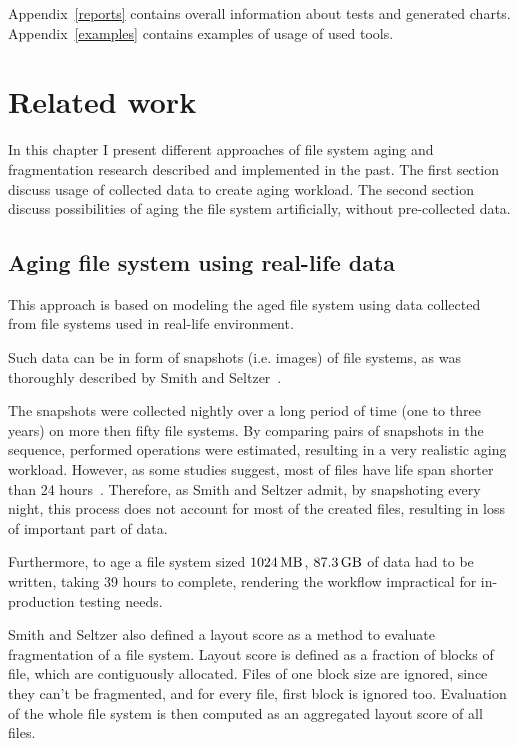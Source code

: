 \documentclass[
  color, %
  table, %
  lof,   %
  lot,   %
]{fithesis3}
\begin{document}
Appendix~\ref{reports} contains overall information about tests and generated charts. Appendix~\ref{examples} contains examples of usage of used tools.  

\chapter{Related work}
\label{2}
In this chapter I present different approaches of file system aging and fragmentation research described and implemented in the past. The first section discuss usage of collected data to create aging workload. The second section discuss possibilities of aging the file system artificially, without pre-collected data.

\section{Aging file system using real-life data}
This approach is based on modeling the aged file system using data collected from file systems used in real-life environment.

Such data can be in form of snapshots (i.e. images) of file systems, as was thoroughly described by Smith and Seltzer~\cite{Smith:1997:FSA:258623.258689}.

The snapshots were collected nightly over a long period of time (one to three years) on more then fifty file systems. By comparing pairs of snapshots in the sequence, performed operations were estimated, resulting in a very realistic aging workload. However, as some studies suggest, most of files have life span shorter than 24 hours~\cite{Ousterhout:1985:TAU:323647.323631}. Therefore, as Smith and Seltzer admit, by snapshoting every night, this process does not account for most of the created files, resulting in loss of important part of data.

Furthermore, to age a file system sized $\SI{1024}{\mega\byte}$, $\SI{87.3}{\giga\byte}$ of data had to be written, taking 39 hours to complete, rendering the workflow impractical for in-production testing needs.

Smith and Seltzer also defined a layout score as a method to evaluate fragmentation of a file system. Layout score is defined as a fraction of blocks of file, which are contiguously allocated. Files of one block size are ignored, since they can't be fragmented, and for every file, first block is ignored too. Evaluation of the whole file system is then computed as an aggregated layout score of all files.
\end{document}
